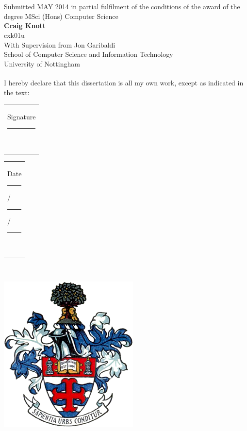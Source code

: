 \begin{center}
\ \\[1cm]
\LARGE{\textbf{\paperTitle}}\ \\[0.5cm]
\large{Submitted MAY 2014 in partial fulfilment of the conditions of the award of the degree MSci (Hons) Computer Science}
\ \\[1cm]
\large{\textbf{Craig Knott}} \ \\
\large{cxk01u}\ \\[0.3cm]

With Supervision from Jon Garibaldi\\[0.3cm]

School of Computer Science and Information Technology \ \\
University of Nottingham \ \\
 \ \\[0.5cm]
I hereby declare that this dissertation is all my own work, except as indicated in the text: \ \\[1cm]
\end{center}

\begin{Large}
\begin{center}
\begin{tabular}{l}
Signature \rule{5cm}{1pt} \ \\[0.2cm]
\end{tabular}
\end{center}

\begin{center}
\begin{tabular}{l}
Date \rule{1.5cm}{1pt}/\rule{1.5cm}{1pt}/\rule{1.5cm}{1pt}\ \\
\end{tabular}
\end{center}
\end{Large}

\ \\[0.6cm]
\begin{center}
\includegraphics[scale=0.55]{images/UoN_Arms}
\end{center}